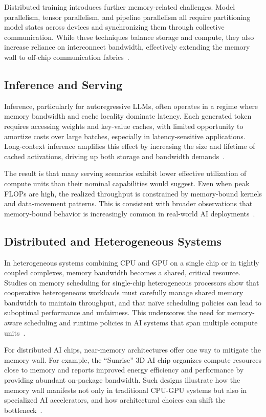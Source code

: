 \documentclass[conference]{IEEEtran}
\begin{document}
Distributed training introduces further memory-related challenges. Model parallelism, tensor parallelism, and pipeline parallelism all require partitioning model states across devices and synchronizing them through collective communication. While these techniques balance storage and compute, they also increase reliance on interconnect bandwidth, effectively extending the memory wall to off-chip communication fabrics~\cite{sunrise2020}.

\subsection{Inference and Serving}

Inference, particularly for autoregressive LLMs, often operates in a regime where memory bandwidth and cache locality dominate latency. Each generated token requires accessing weights and key-value caches, with limited opportunity to amortize costs over large batches, especially in latency-sensitive applications. Long-context inference amplifies this effect by increasing the size and lifetime of cached activations, driving up both storage and bandwidth demands~\cite{gholami2024ai}.

The result is that many serving scenarios exhibit lower effective utilization of compute units than their nominal capabilities would suggest. Even when peak FLOPs are high, the realized throughput is constrained by memory-bound kernels and data-movement patterns. This is consistent with broader observations that memory-bound behavior is increasingly common in real-world AI deployments~\cite{gholami2024ai}.

\subsection{Distributed and Heterogeneous Systems}

In heterogeneous systems combining CPU and GPU on a single chip or in tightly coupled complexes, memory bandwidth becomes a shared, critical resource. Studies on memory scheduling for single-chip heterogeneous processors show that cooperative heterogeneous workloads must carefully manage shared memory bandwidth to maintain throughput, and that naïve scheduling policies can lead to suboptimal performance and unfairness. This underscores the need for memory-aware scheduling and runtime policies in AI systems that span multiple compute units~\cite{heterogeneous2021}.

For distributed AI chips, near-memory architectures offer one way to mitigate the memory wall. For example, the ``Sunrise'' 3D AI chip organizes compute resources close to memory and reports improved energy efficiency and performance by providing abundant on-package bandwidth. Such designs illustrate how the memory wall manifests not only in traditional CPU-GPU systems but also in specialized AI accelerators, and how architectural choices can shift the bottleneck~\cite{sunrise2020}.
\end{document}
